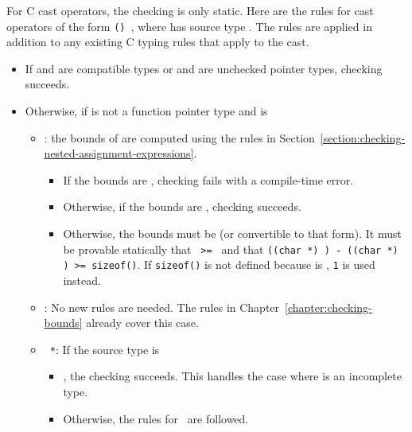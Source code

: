 For C cast operators, the checking is only static.
Here are the rules for cast operators of the form \texttt{() },
where  has source type .  The rules are applied in addition
to any existing C typing rules that apply to the cast.
\begin{itemize}
\item If  and  are compatible types or  and  are unchecked
pointer types, checking succeeds.
\item Otherwise, if  is not a function pointer type and  is
\begin{itemize}
\item \ptrT: the bounds of  are computed using the rules
in Section~\ref{section:checking-nested-assignment-expressions}.
\begin{itemize}
\item If the bounds are \boundsunknown, checking fails with a compile-time
error.
\item Otherwise, if the bounds are \boundsany, checking 
succeeds.
\item Otherwise, the bounds must be  (or convertible
to that form).  It must be provable statically that \texttt{ >= }
and that {\texttt{((char *) ) - ((char *) ) >= sizeof()}}.
If \texttt{sizeof()} is not defined because  is \void, \texttt{1} is
used instead.
\end{itemize}
\item \arrayptrT: No new rules are needed.   The rules in
Chapter~\ref{chapter:checking-bounds} already cover this case.
\item \texttt{ *}: If the source type  is
\begin{itemize}
\item \ptrT, the checking succeeds. This handles the case where 
is an incomplete type.
\item Otherwise, the rules for \ptrT\ are followed.
\end{itemize}
\end{itemize}


\end{itemize}
